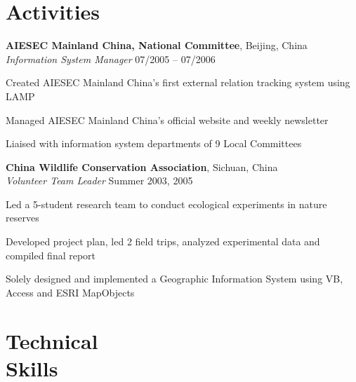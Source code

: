 \documentclass[margin,line]{resume}
\begin{document}
\begin{resume}
    \section{\mysidestyle Activities}

    \textbf{AIESEC Mainland China, National Committee}, Beijing, China \\
    \textsl{Information System Manager} \hfill 07/2005 -- 07/2006 \vspace{-3mm}\\\vspace{-1mm}%
      \begin{list2}
      \item Created AIESEC Mainland China's first external relation tracking system using LAMP
      \item Managed AIESEC Mainland China's official website and weekly newsletter 
      \item Liaised with information system departments of 9 Local Committees 
      \end{list2}

    \textbf{China Wildlife Conservation Association}, Sichuan, China \\
    \textsl{Volunteer Team Leader} \hfill Summer 2003, 2005  \vspace{-3mm}\\\vspace{-1mm}%
      \begin{list2}
      \item Led a 5-student research team to conduct ecological experiments in nature reserves 
      \item Developed project plan, led 2 field trips, analyzed experimental data and compiled final report 
      \item Solely designed and implemented a Geographic Information System using VB, Access and ESRI MapObjects 
      \end{list2}

    \section{\mysidestyle Technical \\ Skills} 
      

\end{resume}
\end{document}
